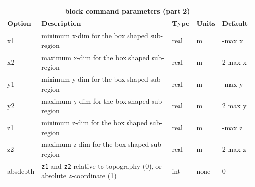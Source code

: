 \documentclass[11pt]{report}
\begin{document}
\begin{center}
\begin{tabular}{|l|p{8cm}|l|l|l|} \hline
\multicolumn{5}{|c|}{\bf block command parameters (part 2)}\\ \hline
{\bf Option} & {\bf Description}          & {\bf Type} & {\bf Units} & {\bf Default} \\ \hline 
\hline
x1          & minimum x-dim for the box shaped sub-region & real & m & -max x \\ \hline
x2          & maximum x-dim for the box shaped sub-region & real & m & 2 max x \\ \hline
\hline
y1          & minimum y-dim for the box shaped sub-region & real & m & -max y \\ \hline
y2          & maximum y-dim for the box shaped sub-region & real & m & 2 max y \\ \hline
\hline
z1          & minimum z-dim for the box shaped sub-region & real & m & -max z \\ \hline
z2          & maximum z-dim for the box shaped sub-region & real & m & 2 max z \\ \hline
\hline
absdepth    & {\tt z1} and {\tt z2} relative to topography (0), or absolute $z$-coordinate (1) & int
& none & 0 \\ \hline 
\end{tabular}
\end{center}
%
\end{document}
